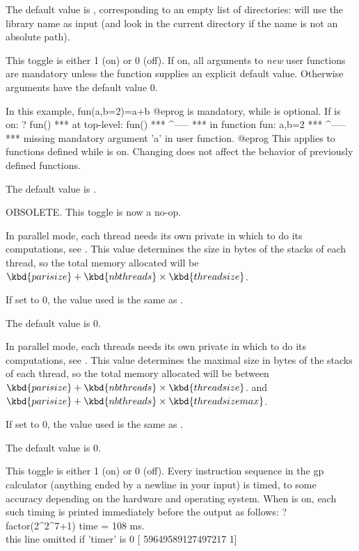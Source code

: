 {The default value is , corresponding to an empty list of
directories:  will use the library name as input (and look in
the current directory if the name is not an absolute path).

\label{se:def,strictargs}
This toggle is either 1 (on) or 0 (off). If on, all arguments to \emph{new}
user functions are mandatory unless the function supplies an explicit default
value.
Otherwise arguments have the default value $0$.

In this example,
\bprog
  fun(a,b=2)=a+b
@eprog
 is mandatory, while  is optional. If  is on:
\bprog
? fun()
 ***   at top-level: fun()
 ***                 ^-----
 ***   in function fun: a,b=2
 ***                    ^-----
 ***   missing mandatory argument 'a' in user function.
@eprog
This applies to functions defined while  is on. Changing 
does not affect the behavior of previously defined functions.

The default value is .

\label{se:def,strictmatch}
OBSOLETE. This toggle is now a no-op.

\label{se:def,threadsize}
In parallel mode, each thread needs its own private  in which
to do its computations, see . This value determines the size
in bytes of the stacks of each thread, so the total memory allocated will be
$\kbd{parisize}+\kbd{nbthreads}\times\kbd{threadsize}$.

If set to $0$, the value used is the same as .

The default value is $0$.

\label{se:def,threadsizemax}
In parallel mode, each threads needs its own private  in which
to do its computations, see . This value determines the maximal
size in bytes of the stacks of each thread, so the total memory allocated will
be between $\kbd{parisize}+\kbd{nbthreads}\times\kbd{threadsize}$. and
$\kbd{parisize}+\kbd{nbthreads}\times\kbd{threadsizemax}$.

If set to $0$, the value used is the same as .

The default value is $0$.

\label{se:def,timer}
This toggle is either 1 (on) or 0 (off). Every instruction sequence
in the gp calculator (anything ended by a newline in your input) is timed,
to some accuracy depending on the hardware and operating system. When
 is on, each such timing is printed immediately before the
output as follows:
\bprog
? factor(2^2^7+1)
time = 108 ms.     \\ this line omitted if 'timer' is 0
[     59649589127497217 1]

}

